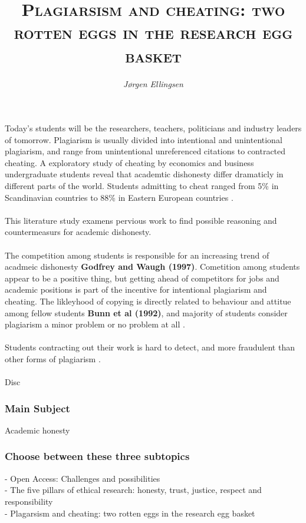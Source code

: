 \documentclass[10pt,a4paper]{article}
\author{\textit{Jørgen Ellingsen}}
\title{\textsc{Plagiarsism and cheating: two rotten eggs in the research egg basket}}
\begin{document}
\maketitle
\date{}

Today's students will be the researchers, teachers, politicians and industry leaders of tomorrow. Plagiarism is usually divided into intentional and unintentional plagiarism, and range from unintentional unreferenced citations to contracted cheating. A exploratory study of cheating by economics and business undergraduate students reveal that academtic dishonesty differ dramaticly in different parts of the world. Students admitting to cheat ranged from 5\% in Scandinavian countries to 88\% in Eastern European countries \cite{Teixeira2010}.
\\ \\
This literature study examens pervious work to find possible reasoning and countermeasurs for academic dishonesty. 
\\ \\
The competition among students is responsible for an increasing trend of acadmeic dishonesty \textbf{Godfrey and Waugh (1997)}. Cometition among students appear to be a positive thing, but getting ahead of competitors for jobs and academic positions is part of the incentive for intentional plagiarism and cheating. The likleyhood of copying is directly related to behaviour and attitue among fellow students \textbf{Bunn et al (1992)}, and majority of students consider plagiarism a minor problem or no problem at all \cite{Teixeira2010}.
\\ \\
Students contracting out their work is hard to detect, and more fraudulent than other forms of plagiarism \cite{Walker2012}. 
\\ \\
Disc

\clearpage

\subsubsection*{Main Subject}
Academic honesty

\subsubsection*{Choose between these three subtopics}

- Open Access: Challenges and possibilities\\
- The five pillars of ethical research: honesty, trust, justice, respect and responsibility\\
- Plagarsism and cheating: two rotten eggs in the research egg basket
\end{document}
